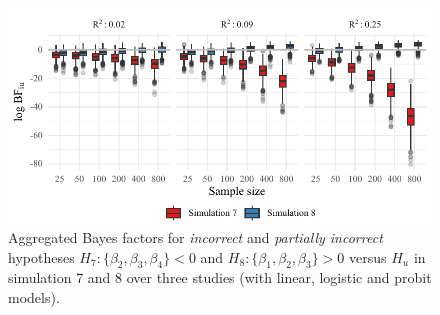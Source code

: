 \documentclass[
]{interact}
\begin{document}
                    \begin{figure}[!t]
                    
                    {\centering \includegraphics[width=1\textwidth,height=\textheight]{manuscript_VK_files/figure-pdf/fig-BF78-1.pdf}
                      
                    }
                    
                    \caption{\label{fig-BF78}Aggregated Bayes factors for \textit{incorrect}
                      and \textit{partially incorrect} hypotheses
                      \(H_7: \{\beta_2, \beta_3, \beta_4\} < 0\) and
                      \(H_8: \{\beta_1, \beta_2, \beta_3\} > 0\) versus \(H_u\) in simulation
                      7 and 8 over three studies (with linear, logistic and probit models).}
                    
                    \end{figure}
                    
\end{document}
